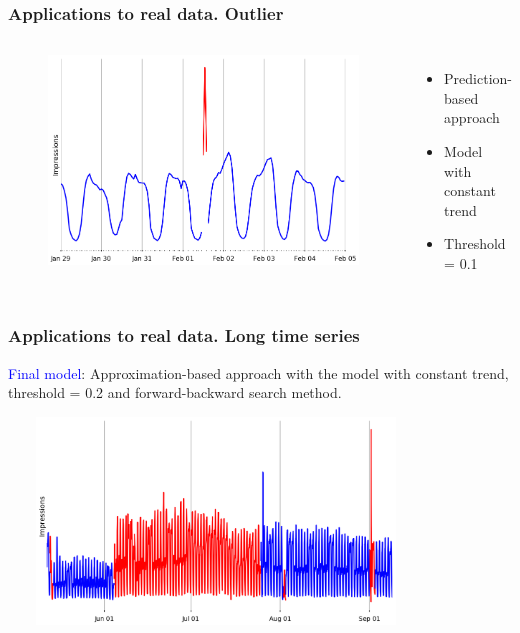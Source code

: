 \documentclass[intlimits, 9pt, unicode]{beamer}
\newcommand{\textblue}[1]{\textcolor{blue}{#1}}
\begin{document}
\begin{frame}
    \frametitle{Applications to real data. Outlier}
  \begin{columns}[T,onlytextwidth]
	\begin{figure}
	\includegraphics[scale=0.2]{images/methods_comparison_4}
	\end{figure}
	    \begin{itemize}
	    \item Prediction-based approach
        \item Model with constant trend
        \item Threshold = 0.1
	    \end{itemize}
     \end{columns}

\end{frame}

\begin{frame}
    \frametitle{Applications to real data. Long time series}

\textblue{Final model}: Approximation-based approach with the model with constant trend, threshold = 0.2 and forward-backward search method.

\bigskip
\medskip
	\includegraphics[height = 5.5cm, width = 11.0cm]{images/long_ts_1}
\end{frame}
\end{document}
